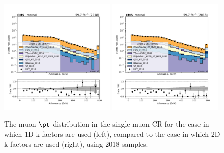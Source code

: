 \begin{figure}
    \begin{center}
        \includegraphics[width=0.49\textwidth]{fig/datamc_1dkfac/cr_1m_vbf/cr_1m_vbf_muon_pt_losf_2018.pdf}
        \includegraphics[width=0.49\textwidth]{fig/datamc/cr_1m_vbf/cr_1m_vbf_muon_pt_losf_2018.pdf} 
        \caption{The muon $\pt$ distribution in the single muon CR for the case in which 1D k-factors are used (left), 
        compared to the case in which 2D k-factors are used (right), using 2018 samples.}
        \label{fig:muon_pt_2018}
    \end{center}
\end{figure}

